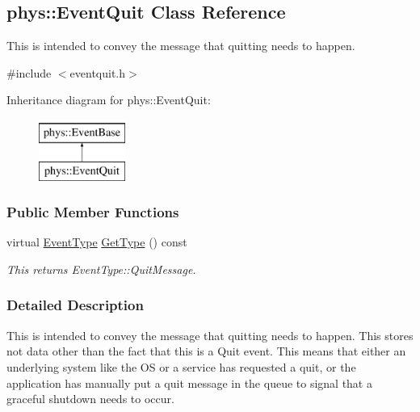 \hypertarget{classphys_1_1EventQuit}{
\subsection{phys::EventQuit Class Reference}
\label{dd/dea/classphys_1_1EventQuit}
}


This is intended to convey the message that quitting needs to happen.  




{\ttfamily \#include $<$eventquit.h$>$}

Inheritance diagram for phys::EventQuit:\begin{figure}[H]
\begin{center}
\leavevmode
\includegraphics[height=2.000000cm]{dd/dea/classphys_1_1EventQuit}
\end{center}
\end{figure}
\subsubsection*{Public Member Functions}
\begin{DoxyCompactItemize}
\item 
virtual \hyperlink{classphys_1_1EventBase_a5e6a8564e127f654123f0bf6a2751923}{EventType} \hyperlink{classphys_1_1EventQuit_a3bfca875349e73dbda47c3c62a253e3b}{GetType} () const 
\begin{DoxyCompactList}\small\item\em This returns EventType::QuitMessage. \item\end{DoxyCompactList}\end{DoxyCompactItemize}


\subsubsection{Detailed Description}
This is intended to convey the message that quitting needs to happen. This stores not data other than the fact that this is a Quit event. This means that either an underlying system like the OS or a service has requested a quit, or the application has manually put a quit message in the queue to signal that a graceful shutdown needs to occur. 


